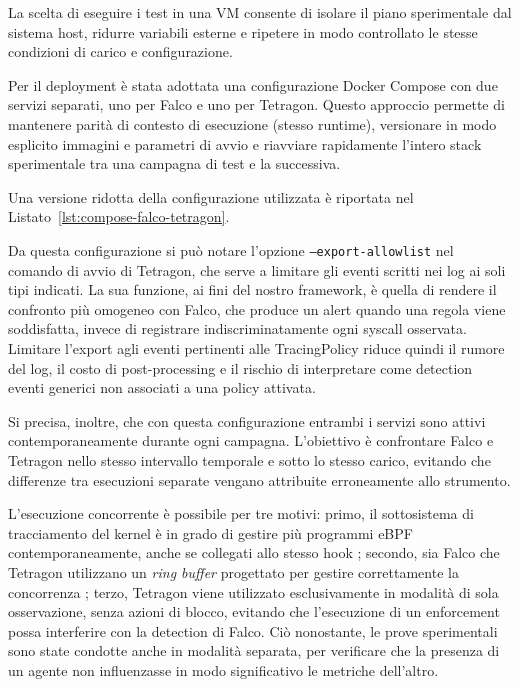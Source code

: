 \documentclass[12pt,a4paper,openright,twoside]{book}
\begin{document}
\noindent
La scelta di eseguire i test in una VM consente di isolare il piano sperimentale dal sistema host, ridurre variabili esterne e ripetere in modo controllato le stesse condizioni di carico e configurazione.

Per il deployment è stata adottata una configurazione Docker Compose con due servizi separati, uno per Falco e uno per Tetragon. Questo approccio permette di mantenere parità di contesto di esecuzione (stesso runtime), versionare in modo esplicito immagini e parametri di avvio e riavviare rapidamente l'intero stack sperimentale tra una campagna di test e la successiva.

Una versione ridotta della configurazione utilizzata è riportata nel Listato~\ref{lst:compose-falco-tetragon}.



Da questa configurazione si può notare l'opzione \texttt{--export-allowlist} nel comando di avvio di Tetragon, che serve a limitare gli eventi scritti nei log ai soli tipi indicati. La sua funzione, ai fini del nostro framework, è quella di rendere il confronto più omogeneo con Falco, che produce un alert quando una regola viene soddisfatta, invece di registrare indiscriminatamente ogni syscall osservata. Limitare l'export agli eventi pertinenti alle TracingPolicy riduce quindi il rumore del log, il costo di post-processing e il rischio di interpretare come detection eventi generici non associati a una policy attivata.

Si precisa, inoltre, che con questa configurazione entrambi i servizi sono attivi contemporaneamente durante ogni campagna. L'obiettivo è confrontare Falco e Tetragon nello stesso intervallo temporale e sotto lo stesso carico, evitando che differenze tra esecuzioni separate vengano attribuite erroneamente allo strumento. 

L'esecuzione concorrente è possibile per tre motivi: primo, il sottosistema di tracciamento del kernel è in grado di gestire più programmi eBPF contemporaneamente, anche se collegati allo stesso hook \cite{ebpf-concurrency,kernel-bpf-headers,kernel-ring-buffer}; secondo, sia Falco che Tetragon utilizzano un \textit{ring buffer} progettato per gestire correttamente la concorrenza \cite{tetragon-github,falco-docs-kernel}; terzo, Tetragon viene utilizzato esclusivamente in modalità di sola osservazione, senza azioni di blocco, evitando che l'esecuzione di un enforcement possa interferire con la detection di Falco.
Ciò nonostante, le prove sperimentali sono state condotte anche in modalità separata, per verificare che la presenza di un agente non influenzasse in modo significativo le metriche dell'altro.
\end{document}
